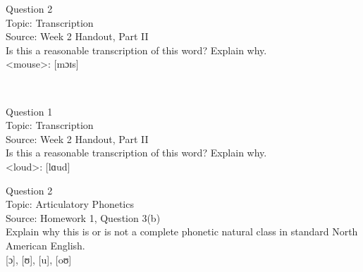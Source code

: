 \documentclass[12pt]{article}
\begin{document}
\newpage

{\large Question 2}\\

Topic: Transcription\\
Source: Week 2 Handout, Part II\\

Is this a reasonable transcription of this word? Explain why.\\

<mouse>: {[mɔɪs]}


\newpage

\begin{center}
\textbf{{\color{red}{\HUGE END OF EXAM}}}\\

\end{center}
\newpage

\begin{center}
\textbf{{\color{blue}{\HUGE START OF EXAM\\}}}

\textbf{{\color{blue}{\HUGE Student ID: 68382\\}}}

\textbf{{\color{blue}{\HUGE 4:30\\}}}

\end{center}
\newpage

{\large Question 1}\\

Topic: Transcription\\
Source: Week 2 Handout, Part II\\

Is this a reasonable transcription of this word? Explain why.\\

<loud>: {[lɑud]}


\newpage

{\large Question 2}\\

Topic: Articulatory Phonetics\\
Source: Homework 1, Question 3(b)\\

Explain why this is or is not a complete phonetic natural class in standard North American English.\\

{[ɔ]}, {[ʊ]}, {[u]}, {[oʊ]}


\newpage

\begin{center}
\textbf{{\color{red}{\HUGE END OF EXAM}}}\\

\end{center}
\newpage
\end{document}
